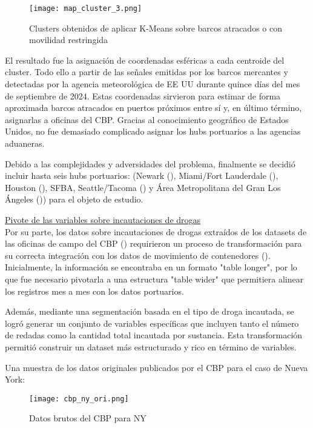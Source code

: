 \documentclass[12pt]{article}
\begin{document}
		\begin{figure}[H]
			\caption{\label{map_cluster_3} Clusters obtenidos de aplicar K-Means sobre barcos atracados o con movilidad restringida}
			\centering
			\texttt{[image: map\_cluster\_3.png]}
		\end{figure}
		
		 El resultado fue la asignación de coordenadas esféricas a cada centroide del cluster. Todo ello a partir de las señales emitidas por los barcos mercantes y detectadas por la agencia meteorológica de EE UU durante quince días del mes de septiembre de 2024. Estas coordenadas sirvieron para estimar de forma aproximada barcos atracados en puertos próximos entre sí y, en último término, asignarlas a oficinas del CBP. Gracias al conocimiento geográfico de Estados Unidos, no fue demasiado complicado asignar los hubs portuarios a las agencias aduaneras.
		 
		 Debido a las complejidades y adversidades del problema, finalmente se decidió incluir hasta seis hubs portuarios: (Newark (\cite{panynj2025facts}), Miami/Fort Lauderdale (\cite{porteverglades2025stats}), Houston (\cite{porthouston2025teus}), SFBA, Seattle/Tacoma (\cite{nwseaportalliance2025cargo}) y Área Metropolitana del Gran Los Ángeles (\cite{portla2025containerstats})) para el objeto de estudio.
		 
		 \underline{Pivote de las variables sobre incautaciones de drogas}\\
		 Por su parte, los datos sobre incautaciones de drogas extraídos de los datasets de las oficinas de campo del CBP (\cite{cbp2025drugseizures}) requirieron un proceso de transformación para su correcta integración con los datos de movimiento de contenedores (\cite{cbp2022drugseizures}). Inicialmente, la información se encontraba en un formato "table longer", por lo que fue necesario pivotarla a una estructura "table wider" que permitiera alinear los registros mes a mes con los datos portuarios.
		 
		 Además, mediante una segmentación basada en el tipo de droga incautada, se logró generar un conjunto de variables específicas que incluyen tanto el número de redadas como la cantidad total incautada por sustancia. Esta transformación permitió construir un dataset más estructurado y rico en término de variables.
		 
		 Una muestra de los datos originales publicados por el CBP para el caso de Nueva York:
		\begin{figure}[H]
			\caption{\label{cbp_ny_ori} Datos brutos del CBP para NY}
			\centering
			\hspace*{1cm}
			\texttt{[image: cbp\_ny\_ori.png]}
		\end{figure}
	
\end{document}
